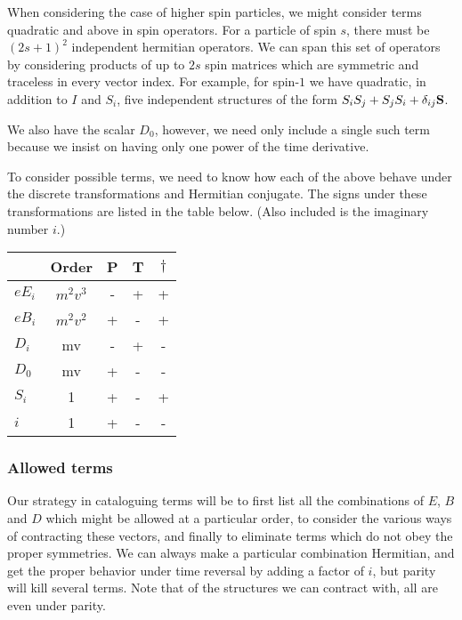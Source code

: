 When considering the case of higher spin particles, we might consider terms quadratic and above in spin operators.  For a particle of spin $s$, there must be $(2s+1)^2$ independent hermitian operators.  We can span this set of operators by considering products of up to $2s$ spin matrices which are symmetric and traceless in every vector index.  For example, for spin-$1$ we have quadratic, in addition to $I$ and $S_i$, five independent structures of the form $ S_i S_j + S_j S_i + \delta_{ij} \mathbf{S}$.

We also have the scalar $D_0$, however, we need only include a single such term because we insist on having only one power of the time derivative.

To consider possible terms, we need to know how each of the above behave under the discrete transformations and Hermitian conjugate.  The signs under these transformations are listed in the table below.  (Also included is the imaginary number $i$.)


\begin{tabular}{l|c|ccc}
& Order	&	P	&	T	&	$\dagger$	\\
\hline
$eE_i$	&$m^2v^3$	&	-	& 	+	&	+		\\
$eB_i$	&$m^2v^2$	&	+	&   -	&	+		\\
$D_i$		& mv	&	-	&	+	&	-		\\
$D_0$		& mv	&	+	&	-	&	-		\\
$S_i$		& 1		&	+	&	-	&	+		\\
$i$		& 1		&	+	&	-	&	-		\\
\end{tabular}

\subsubsection{Allowed terms}
Our strategy in cataloguing terms will be to first list all the combinations of $E$, $B$ and $D$ which might be allowed at a particular order, to consider the various ways of contracting these vectors, and finally to eliminate terms which do not obey the proper symmetries.  We can always make a particular combination Hermitian, and get the proper behavior under time reversal by adding a factor of $i$, but parity will kill several terms.  Note that of the structures we can contract with, all are even under parity.


